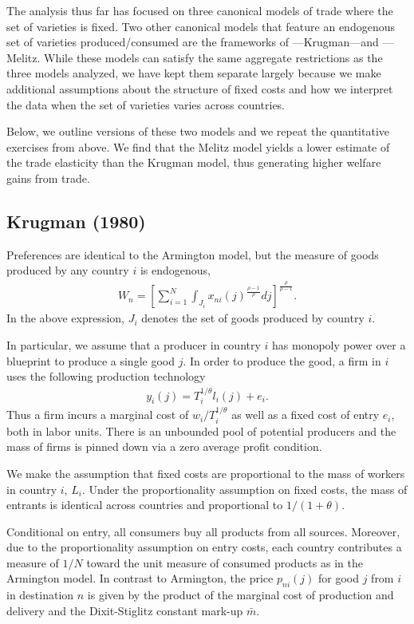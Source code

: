 \documentclass[12pt,dvips, ps2pdf]{article}
\begin{document}
The analysis thus far has focused on three canonical models of trade where the set of varieties is fixed. Two other canonical models that feature an endogenous set of varieties produced/consumed are the frameworks of \citet{krug80}---Krugman---and \citet{mel03}---Melitz. While these models can satisfy the same aggregate restrictions as the three models analyzed, we have kept them separate largely because we make additional assumptions about the structure of fixed costs and how we interpret the data when the set of varieties varies across countries.

Below, we outline versions of these two models and we repeat the quantitative exercises from above. We find that the Melitz model yields a lower estimate of the trade elasticity than the Krugman model, thus generating higher welfare gains from trade.

\subsection{Krugman (1980)}

Preferences are identical to the Armington model, but the measure of goods produced by any country $i$ is endogenous,
\begin{eqnarray*}
W_n = \left [\sum_{i=1}^N\int_{J_i} x_{ni}(j)^{\frac{\rho-1}{\rho}}dj\right ]^\frac{\rho}{\rho-1}.
\end{eqnarray*}
In the above expression, $J_i$ denotes the set of goods produced by country $i$.

 In particular, we assume that a producer in country $i$ has monopoly power over a blueprint to produce a single good $j$. In order to produce the good, a firm in $i$ uses the following production technology
\begin{eqnarray*}
y_i(j) = T_i^{1/\theta} l_i(j) + e_i.
\end{eqnarray*}
Thus a firm incurs a marginal cost of $w_i/T_i^{1/\theta}$ as well as a fixed cost of entry $e_i$, both in labor units. There is an unbounded pool of potential producers and the mass of firms is pinned down via a zero average profit condition.

We make the assumption that fixed costs are proportional to the mass of workers in country $i$, $L_i$. Under the proportionality assumption on fixed costs, the mass of entrants is identical across countries and proportional to $1/(1+\theta)$.

Conditional on entry, all consumers buy all products from all sources. Moreover, due to the proportionality assumption on entry costs, each country contributes a measure of $1/N$ toward the unit measure of consumed products as in the Armington model. In contrast to Armington, the price $p_{ni}(j)$ for good $j$ from $i$ in destination $n$ is given by the product of the marginal cost of production and delivery and the Dixit-Stiglitz constant mark-up $\bar m$.
\end{document}
